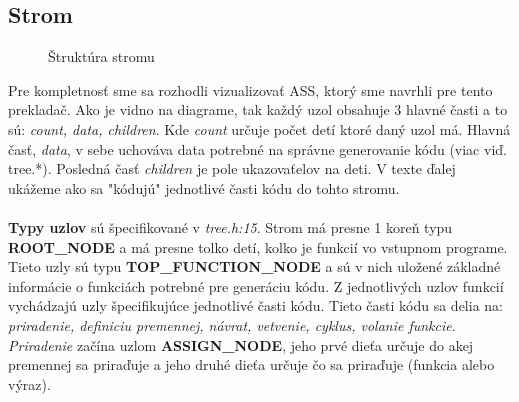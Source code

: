 \documentclass[Slovak, a4paper, 12pt]{article}
\begin{document}
	\subsection{Strom}
	\begin{figure}
		\caption{Štruktúra stromu}
	\end{figure}
	Pre kompletnosť sme sa rozhodli vizualizovať ASS, ktorý sme navrhli pre tento prekladač.
	Ako je vidno na diagrame, tak každý uzol obsahuje 3 hlavné časti a to sú: \textit{count, data, children}. Kde \textit{count}
	určuje počet detí ktoré daný uzol má. Hlavná časť, \textit{data}, v sebe uchováva data potrebné na správne generovanie kódu
	(viac viď. tree.*). Posledná časť \textit{children} je pole ukazovaťelov na deti.  V texte ďalej ukážeme ako sa "kódujú" jednotlivé časti kódu do tohto stromu.
	\\\\
	\textbf{Typy uzlov} sú špecifikované v \textit{tree.h:15}. Strom má presne 1 koreň typu \textbf{ROOT\_NODE}  a má presne tolko detí, kolko je funkcií vo
	vstupnom programe. Tieto uzly sú typu \textbf{TOP\_FUNCTION\_NODE} a sú v nich uložené základné informácie o funkciách potrebné pre generáciu kódu.
	Z jednotlivých uzlov funkcií vychádzajú uzly špecifikujúce jednotlivé časti kódu. Tieto časti kódu sa delia na: \textit{priradenie, definiciu premennej, návrat, vetvenie, cyklus, volanie funkcie}. \\[0.6em]
	\textit{Priradenie} začína uzlom \textbf{ASSIGN\_NODE}, jeho prvé dieťa určuje do akej premennej sa priraďuje a jeho druhé dieťa určuje čo sa priraďuje (funkcia alebo výraz).\\[0.6em]
\end{document}

